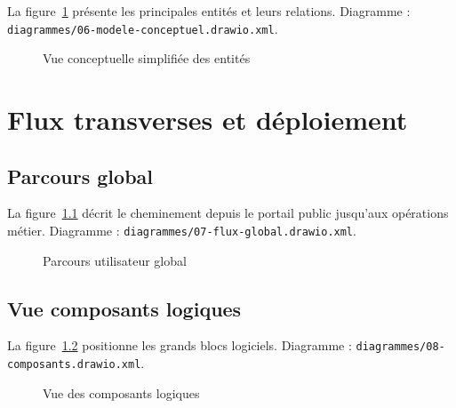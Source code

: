 \documentclass[12pt,a4paper]{report}
\begin{document}
La figure~\ref{fig:mcd} présente les principales entités et leurs relations. Diagramme : \texttt{diagrammes/06-modele-conceptuel.drawio.xml}.

\begin{figure}[htbp]
\centering
{}
\caption{Vue conceptuelle simplifiée des entités}
\label{fig:mcd}
\end{figure}

\chapter{Flux transverses et déploiement}

\section{Parcours global}

La figure~\ref{fig:flux-global} décrit le cheminement depuis le portail public jusqu'aux opérations métier. Diagramme : \texttt{diagrammes/07-flux-global.drawio.xml}.

\begin{figure}[htbp]
\centering
{}
\caption{Parcours utilisateur global}
\label{fig:flux-global}
\end{figure}

\section{Vue composants logiques}

La figure~\ref{fig:composants} positionne les grands blocs logiciels. Diagramme : \texttt{diagrammes/08-composants.drawio.xml}.

\begin{figure}[htbp]
\centering
{}
\caption{Vue des composants logiques}
\label{fig:composants}
\end{figure}
\end{document}
